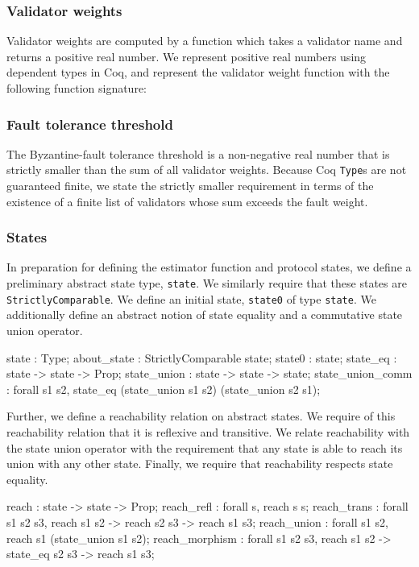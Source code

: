 \documentclass[runningheads]{llncs}
\begin{document}
\subsubsection{Validator weights} 
Validator weights are computed by a function which takes a validator name and returns a positive real number. We represent positive real numbers using dependent types in Coq, and represent the validator weight function with the following function signature: 
\subsubsection{Fault tolerance threshold} 
The Byzantine-fault tolerance threshold is a non-negative real number that is strictly smaller than the sum of all validator weights. Because Coq \verb|Type|s are not guaranteed finite, we state the strictly smaller requirement in terms of the existence of a finite list of validators whose sum exceeds the fault weight. 
\subsubsection{States} 
In preparation for defining the estimator function and protocol states, we define a preliminary abstract state type, 
\verb|state|. We similarly require that these states are \verb|StrictlyComparable|. We define an initial state, \verb|state0| of type \verb|state|. We additionally define an abstract notion of state equality and a commutative state union operator. 
\begin{coq}
	state : Type;
	about_state : StrictlyComparable state;
	state0 : state;
	state_eq : state -> state -> Prop;
	state_union : state -> state -> state;
	state_union_comm : forall s1 s2, state_eq (state_union s1 s2) 
																						(state_union s2 s1);
\end{coq}
Further, we define a reachability relation on abstract states. We require of this reachability relation that it is reflexive and transitive. We relate reachability with the state union operator with the requirement that any state is able to reach its union with any other state. Finally, we require that reachability respects state equality. 
\begin{coq}
	reach : state -> state -> Prop;
	reach_refl : forall s, reach s s; 
	reach_trans : forall s1 s2 s3, reach s1 s2 -> 
															reach s2 s3 -> 
															reach s1 s3; 
	reach_union : forall s1 s2, reach s1 (state_union s1 s2);  
	reach_morphism : forall s1 s2 s3, reach s1 s2 -> 
																		state_eq s2 s3 -> 
																		reach s1 s3;  
\end{coq}
\end{document}
